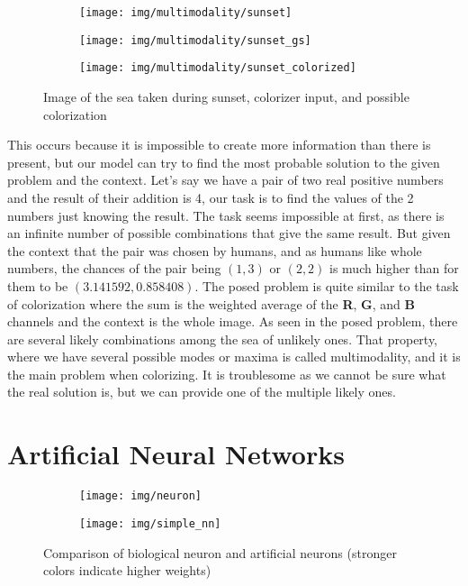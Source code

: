 \begin{figure}
	\centering
	\begin{subfigure}{.32\textwidth}
		\centering
		\texttt{[image: img/multimodality/sunset]}
	\end{subfigure}
	\begin{subfigure}{.32\textwidth}
		\centering
		\texttt{[image: img/multimodality/sunset\_gs]}
	\end{subfigure}
    \begin{subfigure}{.32\textwidth}
		\centering
		\texttt{[image: img/multimodality/sunset\_colorized]}
	\end{subfigure}
    \caption{Image of the sea taken during sunset, colorizer input, and possible colorization}
	\label{fig:multimodality_sunset}
\end{figure}

This occurs because it is impossible to create more information than there is present, 
but our model can try to find the most probable solution to the given problem and the context. 
Let's say we have a pair of two real positive numbers and the result of their 
addition is 4, our task is to find the values of the 2 numbers just knowing the 
result. The task seems impossible at first, as there is an infinite number of possible 
combinations that give the same result. But given the context that the pair was 
chosen by humans, and as humans like whole numbers, the chances of the pair being
$(1, 3)$ or $(2, 2)$ is much higher than for them to be $(3.141592, 0.858408)$. The posed
problem is quite similar to the task of colorization where the sum is the weighted 
average of the \textbf{R}, \textbf{G}, and \textbf{B} channels and the context is the 
whole image. As seen in the posed problem, there are several likely combinations
among the sea of unlikely ones. That property, where we have several possible modes 
or maxima is called multimodality, and it is the main problem when colorizing. It is
troublesome as we cannot be sure what the real solution is, but we can provide one 
of the multiple likely ones.

\section{Artificial Neural Networks}

\begin{figure}
	\centering
	\begin{subfigure}{.49\textwidth}
		\centering
		\texttt{[image: img/neuron]}
	\end{subfigure}
	\begin{subfigure}{.49\textwidth}
		\centering
		\texttt{[image: img/simple\_nn]}
	\end{subfigure}
    \caption{Comparison of biological neuron and artificial neurons (stronger colors indicate higher weights)}
	\label{fig:neuron}
\end{figure}

